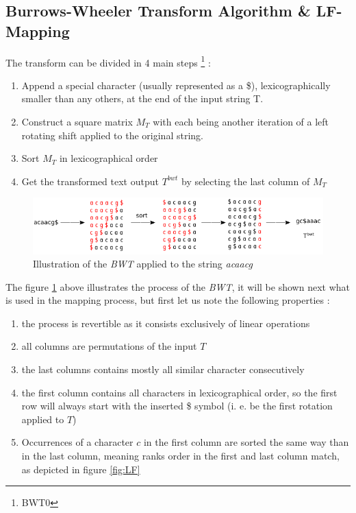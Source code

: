 \subsection{Burrows-Wheeler Transform Algorithm \& LF-Mapping}

The transform can be divided in 4 main steps \footnote{BWT0} :
\begin{enumerate}
\item Append a special character (usually represented as a \$), lexicographically smaller than any others, at the end of the input string \textrm{T}.
\item Construct a square matrix $M_T$ with each being another iteration of a left rotating shift applied to the original string.
\item Sort $M_T$ in lexicographical order
\item Get the transformed text output $T^{bwt}$ by selecting the last column of $M_T$ 
\end{enumerate}

\begin{figure}[h]
\centering
\includegraphics[scale=0.65]{Figures/bwt.png}
\caption{Illustration of the \textsl{BWT} applied to the string \textit{acaacg}}
 \label{fig:bwt}
 \end{figure}
The figure \ref{fig:bwt} above illustrates the process of the \textsl{BWT}, it will be shown next what is used in the mapping process, but first let us note the following properties :
\begin{enumerate}
\item the process is revertible as it consists exclusively of linear operations
\item all columns are permutations of the input $T$
\item the last columns contains mostly all similar character consecutively
\item the first column contains all characters in lexicographical order, so the first row will always start with the inserted \$ symbol (i. e. be the first rotation applied to $T$)
\item Occurrences of a character $c$ in the first column are sorted the same way than in the last column, meaning ranks order in the first and last column match, as depicted in figure \ref{fig:LF}
\end{enumerate}



